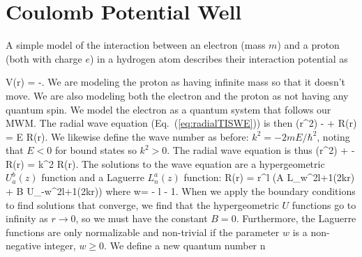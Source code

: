 \section{Coulomb Potential Well}
A simple model of the interaction between an electron (mass $m$) and a proton (both with charge $e$) in a hydrogen atom describes their interaction potential as
\begin{marginfigure}[1cm]
\centering
{}
\end{marginfigure}
\beq
V(r) = -.
\eeq
We are modeling the proton as having infinite mass so that it doesn't move. We are also modeling both the electron and the proton as not having any quantum spin. We model the electron as a quantum system that follows our MWM. The radial wave equation (Eq.~(\ref{eq:radialTISWE})) is then
\beq
{}\left(r^2\right) -  + R(r) = E R(r).
\label{eq:radialhamiltonian}
\eeq
We likewise define the wave number as before: $k^2 = -2mE/\hbar^2$, noting that $E<0$ for bound states so $k^2>0$. The radial wave equation is thus
\beq
{}\left(r^2\right) +  - R(r) = k^2 R(r).
\eeq
The solutions to the wave equation are a hypergeometric $U_a^b(z)$ function and a Laguerre $L_n^a(z)$ function:
\beq
R(r) = r^l \left(A L_w^{2l+1}(2kr) + B U_{-w}^{2l+1}(2kr)\right)
\eeq
where
\beq
w= - l - 1.
\label{eq:wdefn}
\eeq
When we apply the boundary conditions to find solutions that converge, we find that the hypergeometric $U$ functions go to infinity as $r\rightarrow0$, so we must have the constant $B=0$. Furthermore, the Laguerre functions are only normalizable and non-trivial if the parameter $w$ is a non-negative integer, $w\geq 0$. We define a new quantum number
\beq
n \equiv {}
\eeq{}
